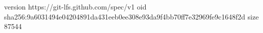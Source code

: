 version https://git-lfs.github.com/spec/v1
oid sha256:9a6031494e04204891da431eeb0ee308e93da9f4bb70ff7e32969fe9c1648f2d
size 87544
